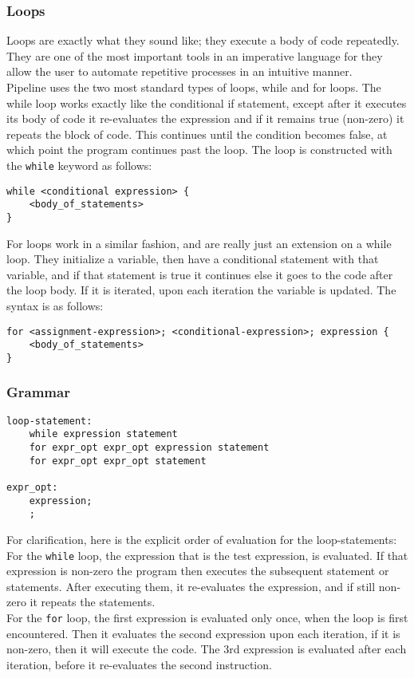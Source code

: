 \documentclass[./LRM_main.tex]{subfiles}
\begin{document}
\subsubsection{Loops}
Loops are exactly what they sound like; they execute a body of code repeatedly. They are one of the most important tools in an imperative language for they allow the user to automate repetitive processes in an intuitive manner.\\
Pipeline uses the two most standard types of loops, while and for loops. The while loop works exactly like the conditional if statement, except after it executes its body of code it re-evaluates the expression and if it remains true (non-zero) it repeats the block of code. This continues until the condition becomes false, at which point the program continues past the loop. The loop is constructed with the \texttt{while} keyword as follows:
\begin{lstlisting}
while <conditional expression> {
	<body_of_statements>
}
\end{lstlisting}
For loops work in a similar fashion, and are really just an extension on a while loop. They initialize a variable, then have a conditional statement with that variable, and if that statement is true it continues else it goes to the code after the loop body. If it is iterated, upon each iteration the variable is updated. The syntax is as follows:
\begin{lstlisting}
for <assignment-expression>; <conditional-expression>; expression {
	<body_of_statements>
}
\end{lstlisting}
\subsubsection{Grammar}
\begin{lstlisting}
loop-statement:
	while expression statement
	for expr_opt expr_opt expression statement
	for expr_opt expr_opt statement

expr_opt:
	expression;
	;	
\end{lstlisting}
For clarification, here is the explicit order of evaluation for the loop-statements:\\
For the \texttt{while} loop, the expression that is the test expression, is evaluated. If that expression is non-zero the program then executes the subsequent statement or statements. After executing them, it re-evaluates the expression, and if still non-zero it repeats the statements.\\
For the \texttt{for} loop, the first expression is evaluated only once, when the loop is first encountered. Then it evaluates the second expression upon each iteration, if it is non-zero, then it will execute the code. The 3rd expression is evaluated after each iteration, before it re-evaluates the second instruction.
\end{document}
